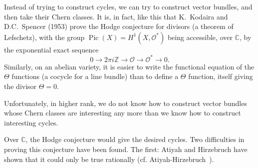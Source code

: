 \documentclass{article}
\theoremstyle{plain}
\theoremstyle{definition}
\newcommand{\sh}{\mathscr}
\newcommand{\ZZ}{\mathbb{Z}}
\newcommand{\CC}{\mathbb{C}}
\DeclareMathOperator{\Pic}{Pic}
\newcommand{\oldpage}[1]{\marginpar{\footnotesize$\Big\vert$ \textit{p.~#1}}}
\begin{document}
Instead of trying to construct cycles, we can try to construct vector bundles, and then take their Chern classes.
It is, in fact, like this that K.~Kodaira and D.C.~Spencer (1953) prove the Hodge conjecture for divisors (a theorem of Lefschetz), with the group $\Pic(X)=H^1(X,\sh{O}^*)$ being accessible, over $\CC$, by the exponential exact sequence
\[
  0 \to 2\pi i\ZZ \to \sh{O} \to \sh{O}^* \to 0.
\]
Similarly, on an abelian variety, it is easier to write the functional equation of the $\Theta$ functions (a cocycle for a line bundle) than to define a $\Theta$ function, itself giving the divisor $\Theta=0$.

\oldpage{144}
Unfortunately, in higher rank, we do not know how to construct vector bundles whose Chern classes are interesting any more than we know how to construct interesting cycles.

Over $\CC$, the Hodge conjecture would give the desired cycles.
Two difficulties in proving this conjecture have been found.
The first: Atiyah and Hirzebruch have shown that it could only be true rationally (cf. Atiyah-Hirzebruch~\cite{1}).
\end{document}
